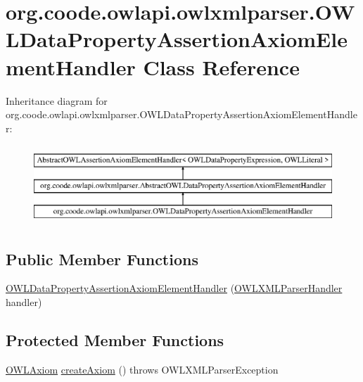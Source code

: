\hypertarget{classorg_1_1coode_1_1owlapi_1_1owlxmlparser_1_1_o_w_l_data_property_assertion_axiom_element_handler}{\section{org.\-coode.\-owlapi.\-owlxmlparser.\-O\-W\-L\-Data\-Property\-Assertion\-Axiom\-Element\-Handler Class Reference}
\label{classorg_1_1coode_1_1owlapi_1_1owlxmlparser_1_1_o_w_l_data_property_assertion_axiom_element_handler}
}
Inheritance diagram for org.\-coode.\-owlapi.\-owlxmlparser.\-O\-W\-L\-Data\-Property\-Assertion\-Axiom\-Element\-Handler\-:\begin{figure}[H]
\begin{center}
\leavevmode
\includegraphics[height=3.000000cm]{classorg_1_1coode_1_1owlapi_1_1owlxmlparser_1_1_o_w_l_data_property_assertion_axiom_element_handler}
\end{center}
\end{figure}
\subsection*{Public Member Functions}
\begin{DoxyCompactItemize}
\item 
\hyperlink{classorg_1_1coode_1_1owlapi_1_1owlxmlparser_1_1_o_w_l_data_property_assertion_axiom_element_handler_a10e6648533d250640c7514a2e3c181e7}{O\-W\-L\-Data\-Property\-Assertion\-Axiom\-Element\-Handler} (\hyperlink{classorg_1_1coode_1_1owlapi_1_1owlxmlparser_1_1_o_w_l_x_m_l_parser_handler}{O\-W\-L\-X\-M\-L\-Parser\-Handler} handler)
\end{DoxyCompactItemize}
\subsection*{Protected Member Functions}
\begin{DoxyCompactItemize}
\item 
\hyperlink{interfaceorg_1_1semanticweb_1_1owlapi_1_1model_1_1_o_w_l_axiom}{O\-W\-L\-Axiom} \hyperlink{classorg_1_1coode_1_1owlapi_1_1owlxmlparser_1_1_o_w_l_data_property_assertion_axiom_element_handler_ae994a66b56e6f0b0e82ee0a88360642f}{create\-Axiom} ()  throws O\-W\-L\-X\-M\-L\-Parser\-Exception 
\end{DoxyCompactItemize}


